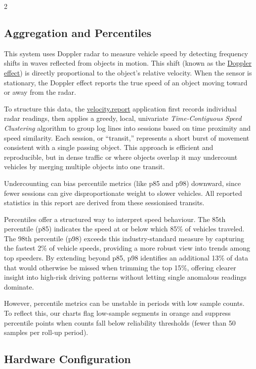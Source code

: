 \documentclass[10pt,letterpaper]{article}
\begin{document}
\begin{multicols}{2}
\subsection*{Aggregation and Percentiles}
This system uses Doppler radar to measure vehicle speed by detecting frequency shifts in waves reflected from objects in motion. This shift (known as the \href{https://en.wikipedia.org/wiki/Doppler_effect}{Doppler effect}) is directly proportional to the object's relative velocity. When the sensor is stationary, the Doppler effect reports the true speed of an object moving toward or away from the radar.
\par
To structure this data, the \href{https://velocity.report}{velocity.report} application first records individual radar readings, then applies a greedy, local, univariate \emph{Time-Contiguous Speed Clustering} algorithm to group log lines into sessions based on time proximity and speed similarity. Each session, or ``transit,'' represents a short burst of movement consistent with a single passing object. This approach is efficient and reproducible, but in dense traffic or where objects overlap it may undercount vehicles by merging multiple objects into one transit.
\par
Undercounting can bias percentile metrics (like p85 and p98) downward, since fewer sessions can give disproportionate weight to slower vehicles. All reported statistics in this report are derived from these sessionised transits.
\par
Percentiles offer a structured way to interpret speed behaviour. The 85th percentile (p85) indicates the speed at or below which 85\% of vehicles traveled. The 98th percentile (p98) exceeds this industry-standard measure by capturing the fastest 2\% of vehicle speeds, providing a more robust view into trends among top speeders. By extending beyond p85, p98 identifies an additional 13\% of data that would otherwise be missed when trimming the top 15\%, offering clearer insight into high-risk driving patterns without letting single anomalous readings dominate.
\par
However, percentile metrics can be unstable in periods with low sample counts. To reflect this, our charts flag low-sample segments in orange and suppress percentile points when counts fall below reliability thresholds (fewer than 50 samples per roll-up period).
\par


\subsection*{Hardware Configuration}


\end{multicols}
\end{document}
